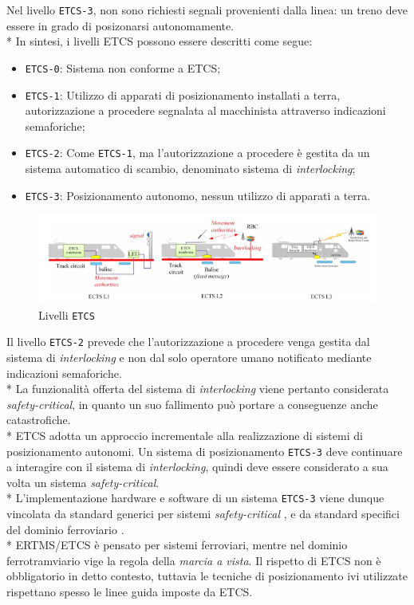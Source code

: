 Nel livello \texttt{ETCS-3}, non sono richiesti segnali provenienti dalla linea: un treno deve essere in grado di posizonarsi autonomamente. \cite{etcs3}\\*
In sintesi, i livelli ETCS possono essere descritti come segue:
\begin{itemize}
	\item \texttt{ETCS-0}: Sistema non conforme a ETCS;
	\item \texttt{ETCS-1}: Utilizzo di apparati di posizionamento installati a terra, autorizzazione a procedere segnalata al macchinista attraverso indicazioni semaforiche;
	\item \texttt{ETCS-2}: Come \texttt{ETCS-1}, ma l'autorizzazione a procedere \`e gestita da un sistema automatico di scambio, denominato sistema di \emph{interlocking};\cite{interlocking}
	\item \texttt{ETCS-3}: Posizionamento autonomo, nessun utilizzo di apparati a terra.
\end{itemize}
\begin{figure}[h]
	\centering
	\includegraphics[width=\linewidth]{img/etcs123.png}
	\caption{Livelli \texttt{ETCS}}
	\label{fig:etcs123}
\end{figure}
Il livello \texttt{ETCS-2} prevede che l'autorizzazione a procedere venga gestita dal sistema di \emph{interlocking} e non dal solo operatore umano notificato mediante indicazioni semaforiche.\\*
La funzionalit\`a offerta del sistema di \emph{interlocking} viene pertanto considerata \emph{safety-critical}, in quanto un suo fallimento pu\`o portare a conseguenze anche catastrofiche.\cite{marocchini}\\*
ETCS adotta un approccio incrementale alla realizzazione di sistemi di posizionamento autonomi. Un sistema di posizionamento \texttt{ETCS-3} deve continuare a interagire con il sistema di \emph{interlocking}, quindi deve essere considerato a sua volta un sistema \emph{safety-critical}.\\*
L'implementazione hardware e software di un sistema \texttt{ETCS-3} viene dunque vincolata da standard generici per sistemi \emph{safety-critical} \cite{MISRA} \cite{sil}, e da standard specifici del dominio ferroviario \cite{50128}.\\*
ERTMS/ETCS \`e pensato per sistemi ferroviari, mentre nel dominio ferrotramviario vige la regola della \emph{marcia a vista}. Il rispetto di ETCS non \`e obbligatorio in detto contesto, tuttavia le tecniche di posizionamento ivi utilizzate rispettano spesso le linee guida imposte da ETCS. 
